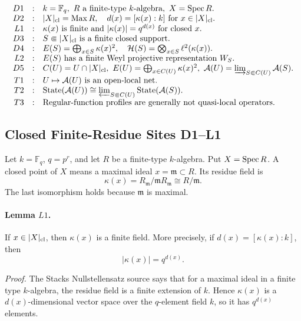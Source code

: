 \[
\begin{array}{rcl}
D1&:&k=\mathbb F_q,\ R\text{ a finite-type }k\text{-algebra},\
      X=\operatorname{Spec} R.\\
D2&:&|X|_{\rm cl}=\operatorname{Max}R,\quad
      d(x)=[\kappa(x):k]\text{ for }x\in |X|_{\rm cl}.\\
L1&:&\kappa(x)\text{ is finite and }|\kappa(x)|=q^{d(x)}
      \text{ for closed }x.\\
D3&:&S\Subset |X|_{\rm cl}\text{ is a finite closed support}.\\
D4&:&E(S)=\bigoplus_{x\in S}\kappa(x)^2,\quad
      \mathcal H(S)=\bigotimes_{x\in S}\ell^2(\kappa(x)).\\
L2&:&E(S)\text{ has a finite Weyl projective representation }W_S.\\
D5&:&C(U)=U\cap |X|_{\rm cl},\
      E(U)=\bigoplus_{x\in C(U)}\kappa(x)^2,\
      \mathcal A(U)=\varinjlim_{S\Subset C(U)}\mathcal A(S).\\
T1&:&U\mapsto\mathcal A(U)\text{ is an open-local net}.\\
T2&:&\operatorname{State}(\mathcal A(U))
      \cong\varprojlim_{S\Subset C(U)}
      \operatorname{State}(\mathcal A(S)).\\
T3&:&\text{Regular-function profiles are generally not quasi-local
      operators.}
\end{array}
\]

\subsection{Closed Finite-Residue Sites D1--L1}

Let \(k=\mathbb F_q\), \(q=p^r\), and let \(R\) be a finite-type
\(k\)-algebra.  Put \(X=\operatorname{Spec} R\).  A closed point of \(X\) means a maximal
ideal \(x=\mathfrak m\subset R\).  Its residue field is
\[
  \kappa(x)=R_{\mathfrak m}/\mathfrak m R_{\mathfrak m}
  \cong R/\mathfrak m.
\]
The last isomorphism holds because \(\mathfrak m\) is maximal.

\paragraph{Lemma \(L1\).}
If \(x\in |X|_{\rm cl}\), then \(\kappa(x)\) is a finite field.  More
precisely, if \(d(x)=[\kappa(x):k]\), then
\[
  |\kappa(x)|=q^{d(x)}.
\]

\emph{Proof.}
The Stacks Nullstellensatz source says that for a maximal ideal in a finite
type \(k\)-algebra, the residue field is a finite extension of \(k\).  Hence
\(\kappa(x)\) is a \(d(x)\)-dimensional vector space over the \(q\)-element
field \(k\), so it has \(q^{d(x)}\) elements.

